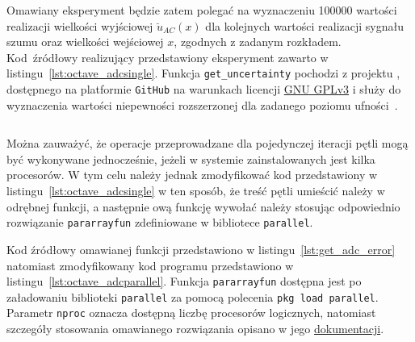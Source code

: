 Omawiany eksperyment będzie zatem polegać na wyznaczeniu \num{100000} wartości realizacji wielkości wyjściowej $\breve{u}_{AC}(x)$ dla kolejnych wartości realizacji sygnału szumu oraz wielkości wejściowej $x$, zgodnych z zadanym rozkładem. Kod źródłowy realizujący przedstawiony eksperyment zawarto w listingu~\ref{lst:octave_adcsingle}. Funkcja \verb|get_uncertainty| pochodzi z projektu \cite{auth_fwtutils}, dostępnego na platformie \texttt{GitHub} na warunkach licencji \href{https://www.gnu.org/licenses/gpl-3.0.html}{GNU GPLv3} i służy do wyznaczenia wartości niepewności rozszerzonej dla zadanego poziomu ufności~\cite{jcgm_guide}.

\begin{listing}[htb]
\inputminted{octave}{skrypty/octave_adcsingle.m}
\end{listing}

Można zauważyć, że operacje przeprowadzane dla pojedynczej iteracji pętli mogą być wykonywane jednocześnie, jeżeli w systemie zainstalowanych jest kilka procesorów. W tym celu należy jednak zmodyfikować kod przedstawiony w listingu~\ref{lst:octave_adcsingle} w ten sposób, że treść pętli umieścić należy w odrębnej funkcji, a następnie ową funkcję wywołać należy stosując odpowiednio rozwiązanie \verb|pararrayfun| zdefiniowane w bibliotece \texttt{parallel}.

Kod źródłowy omawianej funkcji przedstawiono w listingu~\ref{lst:get_adc_error} natomiast zmodyfikowany kod programu przedstawiono w listingu~\ref{lst:octave_adcparallel}. Funkcja \verb|pararrayfun| dostępna jest po załadowaniu biblioteki \texttt{parallel} za pomocą polecenia \texttt{pkg load parallel}. Parametr \verb|nproc| oznacza dostępną liczbę procesorów logicznych, natomiast szczegóły stosowania omawianego rozwiązania opisano w jego \href{https://gnu-octave.github.io/packages/parallel/}{dokumentacji}.

\begin{listing}[htb]
\inputminted{octave}{skrypty/get_adc_error.m}
\end{listing}

\begin{listing}[htb]
\inputminted{octave}{skrypty/octave_adcparallel.m}
\end{listing}

